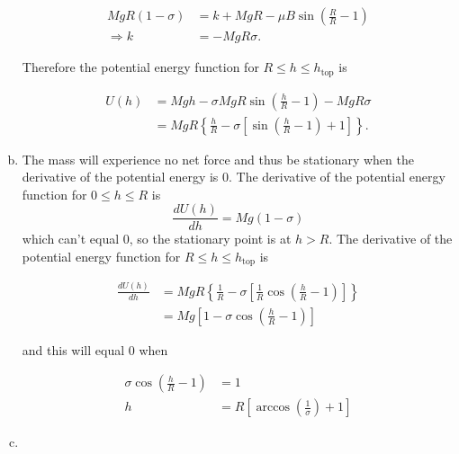 \documentclass{article}
\begin{document}
\begin{enumerate}[(a)]
        \begin{align*}
          M g R (1 - \sigma) & = k + M g R - \mu B \sin \left( \frac{R}{R} - 1 \right) \\
          \Rightarrow k      & = -M g R \sigma.
        \end{align*}

        Therefore the potential energy function for $R \le h \le h_\textrm{top}$ is

        \begin{align*}
          U(h) & = M g h - \sigma M g R \sin \left( \frac{h}{R} - 1 \right) - M g R \sigma                             \\
               & = M g R \left\{ \frac{h}{R} - \sigma \left[ \sin \left( \frac{h}{R} - 1 \right) + 1 \right] \right\}.
        \end{align*}

  \item The mass will experience no net force and thus be stationary when the derivative of the potential energy is 0. The derivative of the potential energy function for $0 \le h \le R$ is \[\frac{d U(h)}{d h} = M g (1 - \sigma)\] which can't equal $0$, so the stationary point is at $h > R$. The derivative of the potential energy function for $R \le h \le h_\textrm{top}$ is

        \begin{align*}
          \frac{d U(h)}{d h} & = M g R \left\{ \frac{1}{R} - \sigma \left[ \frac{1}{R} \cos \left( \frac{h}{R} - 1 \right) \right] \right\} \\
                             & = M g \left[ 1 - \sigma \cos \left( \frac{h}{R} - 1 \right) \right]
        \end{align*}

        and this will equal $0$ when

        \begin{align*}
          \sigma \cos \left( \frac{h}{R} - 1 \right) & = 1                                                            \\
          h                                          & = R \left[ \arccos \left( \frac{1}{\sigma} \right) + 1 \right]
        \end{align*}

  \item


\end{enumerate}
\end{document}
